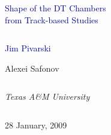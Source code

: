 \documentclass[compress]{beamer}
\begin{document}
\begin{frame}
\vfill
\begin{center}
\textcolor{darkblue}{\Large Shape of the DT Chambers \\ \vspace{0.2 cm} from Track-based Studies}

\vfill
\begin{columns}
\begin{center}
\large
\textcolor{darkblue}{Jim Pivarski}

\vspace{0.2 cm}
Alexei Safonov
\end{center}
\end{columns}

\begin{columns}
\begin{center}
\scriptsize
{\it Texas A\&M University}
\end{center}
\end{columns}

\vfill
28 January, 2009

\end{center}
\end{frame}


\small
\end{document}

